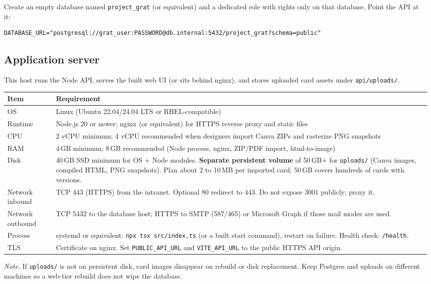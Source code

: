\documentclass[11pt,a4paper]{article}
\begin{document}
Create an empty database named \texttt{project\_grat} (or equivalent) and a dedicated role with rights only on that database. Point the API at it:

\begin{verbatim}
DATABASE_URL="postgresql://grat_user:PASSWORD@db.internal:5432/project_grat?schema=public"
\end{verbatim}

\subsection{Application server}
This host runs the Node API, serves the built web UI (or sits behind nginx), and stores uploaded card assets under \texttt{api/uploads/}.

\begin{tabularx}{\textwidth}{lX}
  \toprule
  \textbf{Item} & \textbf{Requirement} \\
  \midrule
  OS & Linux (Ubuntu 22.04/24.04 LTS or RHEL-compatible) \\
  Runtime & Node.js 20 or newer; nginx (or equivalent) for HTTPS reverse proxy and static files \\
  CPU & 2 vCPU minimum; 4 vCPU recommended when designers import Canva ZIPs and rasterize PNG snapshots \\
  RAM & 4\,GB minimum; 8\,GB recommended (Node process, nginx, ZIP/PDF import, html-to-image) \\
  Disk & 40\,GB SSD minimum for OS + Node modules. \textbf{Separate persistent volume} of 50\,GB+ for \texttt{uploads/} (Canva images, compiled HTML, PNG snapshots). Plan about 2 to 10\,MB per imported card; 50\,GB covers hundreds of cards with versions. \\
  Network inbound & TCP 443 (HTTPS) from the intranet. Optional 80 redirect to 443. Do not expose 3001 publicly; proxy it. \\
  Network outbound & TCP 5432 to the database host; HTTPS to SMTP (587/465) or Microsoft Graph if those mail modes are used. \\
  Process & systemd or equivalent: \texttt{npx tsx src/index.ts} (or a built start command), restart on failure. Health check: \texttt{/health}. \\
  TLS & Certificate on nginx. Set \texttt{PUBLIC\_API\_URL} and \texttt{VITE\_API\_URL} to the public HTTPS API origin. \\
  \bottomrule
\end{tabularx}

\noindent\textit{Note.} If \texttt{uploads/} is not on persistent disk, card images disappear on rebuild or disk replacement. Keep Postgres and uploads on different machines so a web-tier rebuild does not wipe the database.
\end{document}
